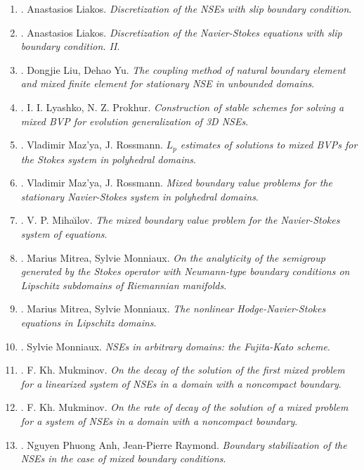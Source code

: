 \documentclass{article}
\begin{document}
\begin{enumerate}
	\item \cite{Liakos2001}. {\sc Anastasios Liakos}. {\it Discretization of the NSEs with slip boundary condition}.
	\item \cite{Liakos2004}. {\sc Anastasios Liakos}. {\it Discretization of the Navier-Stokes equations with slip boundary condition. II}.
	\item \cite{Liu_Yu2008}. {\sc Dongjie Liu, Dehao Yu}. {\it The coupling method of natural boundary element and mixed finite element for stationary NSE in unbounded domains}.
	\item \cite{Lyashko_Prokhur1985}. {\sc I. I. Lyashko, N. Z. Prokhur}. {\it Construction of stable schemes for solving a mixed BVP for evolution generalization of 3D NSEs}.
	\item \cite{Mazya_Rossmann2007}. {\sc Vladimir Maz'ya, J. Rossmann}. {\it$L_p$ estimates of solutions to mixed BVPs for the Stokes system in polyhedral domains}.
	\item \cite{Mazya_Rossmann2009}. {\sc Vladimir Maz'ya, J. Rossmann}. {\it Mixed boundary value problems for the stationary Navier-Stokes system in polyhedral domains}.
	\item \cite{Mihailov1968}. {\sc V. P. Miha\u{\i}lov}. {\it The mixed boundary value problem for the Navier-Stokes system of equations}.
	\item \cite{Mitrea_Monniaux2008}. {\sc Marius Mitrea, Sylvie Monniaux}. {\it On the analyticity of the semigroup generated by the Stokes operator with Neumann-type boundary conditions on Lipschitz subdomains of Riemannian manifolds}.
	\item \cite{Mitrea_Monniaux2009}. {\sc Marius Mitrea, Sylvie Monniaux}. {\it The nonlinear Hodge-Navier-Stokes equations in Lipschitz domains}.
	\item \cite{Monniaux2006}. {\sc Sylvie Monniaux}. {\it NSEs in arbitrary domains: the Fujita-Kato scheme}.
	\item \cite{Mukminov1992a}. {\sc F. Kh. Mukminov}. {\it On the decay of the solution of the first mixed problem for a linearized system of NSEs in a domain with a noncompact boundary}.
	\item \cite{Mukminov1992b}. {\sc F. Kh. Mukminov}. {\it On the rate of decay of the solution of a mixed problem for a system of NSEs in a domain with a noncompact boundary}.
	\item \cite{Nguyen_Raymond2015}. {\sc Nguyen Phuong Anh, Jean-Pierre Raymond}. {\it Boundary stabilization of the NSEs in the case of mixed boundary conditions}.

\end{enumerate}
\end{document}
